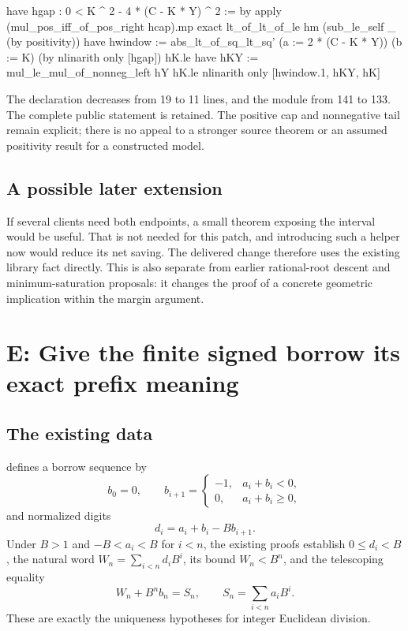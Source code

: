 \documentclass[11pt,a4paper]{article}
\newcommand{\code}[1]{\texttt{\detokenize{#1}}}
\newcommand{\src}[1]{\href{https://github.com/VladimirReshetnikov/ProveIt/blob/29936089835c0c55cca81edc86b4fb0c70ce34d5/Computability/DiophantineConsistency/Lean/DiophantineConsistency/#1.lean}{\code{#1}}}
\begin{document}
\begin{Lean}
  have hgap : 0 < K ^ 2 - 4 * (C - K * Y) ^ 2 := by
    apply (mul_pos_iff_of_pos_right hcap).mp
    exact lt_of_lt_of_le hm (sub_le_self _ (by positivity))
  have hwindow := abs_lt_of_sq_lt_sq'
    (a := 2 * (C - K * Y)) (b := K)
    (by nlinarith only [hgap]) hK.le
  have hKY := mul_le_mul_of_nonneg_left hY hK.le
  nlinarith only [hwindow.1, hKY, hK]
\end{Lean}

The declaration decreases from 19 to 11 lines, and the module from 141 to 133. The complete public statement is retained. The positive cap and nonnegative tail remain explicit; there is no appeal to a stronger source theorem or an assumed positivity result for a constructed model.

\subsection{A possible later extension}

If several clients need both endpoints, a small theorem exposing the interval would be useful. That is not needed for this patch, and introducing such a helper now would reduce its net saving. The delivered change therefore uses the existing library fact directly. This is also separate from earlier rational-root descent and minimum-saturation proposals: it changes the proof of a concrete geometric implication within the margin argument.

\section{E: Give the finite signed borrow its exact prefix meaning}

\subsection{The existing data}

\src{SparseBorrowCarry} defines a borrow sequence by
\[
 b_0=0,\qquad b_{i+1}=\begin{cases}-1,&a_i+b_i<0,\\0,&a_i+b_i\ge0,\end{cases}
\]
and normalized digits
\[
 d_i=a_i+b_i-Bb_{i+1}.
\]
Under \(B>1\) and \(-B<a_i<B\) for \(i<n\), the existing proofs establish \(0\le d_i<B\), the natural word \(W_n=\sum_{i<n}d_iB^i\), its bound \(W_n<B^n\), and the telescoping equality
\[
 W_n+B^n b_n=S_n,
 \qquad S_n=\sum_{i<n}a_iB^i.
\]
These are exactly the uniqueness hypotheses for integer Euclidean division.
\end{document}
